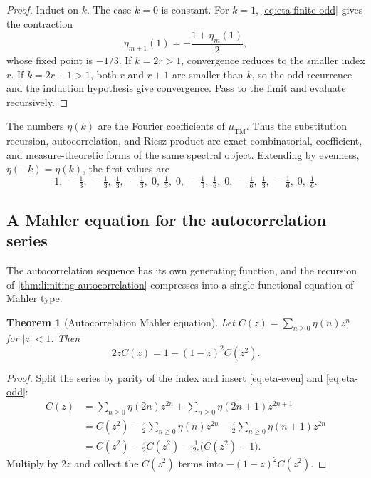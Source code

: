 \documentclass[11pt,oneside]{article}
\numberwithin{equation}{section}
\newtheorem{theorem}{Theorem}[section]
\theoremstyle{definition}
\theoremstyle{remark}
\begin{document}
\begin{proof}
Induct on \(k\).  The case \(k=0\) is constant.  For \(k=1\),
\eqref{eq:eta-finite-odd} gives the contraction
\[
 \eta_{m+1}(1)=-\frac{1+\eta_m(1)}2,
\]
whose fixed point is \(-1/3\).  If \(k=2r>1\), convergence reduces to the
smaller index \(r\).  If \(k=2r+1>1\), both \(r\) and \(r+1\) are smaller
than \(k\), so the odd recurrence and the induction hypothesis give
convergence.  Pass to the limit and evaluate recursively.
\end{proof}

The numbers \(\eta(k)\) are the Fourier coefficients of
\(\mu_{\mathrm{TM}}\).  Thus the substitution recursion, autocorrelation, and
Riesz product are exact combinatorial, coefficient, and measure-theoretic
forms of the same spectral object.  Extending by evenness,
\(\eta(-k)=\eta(k)\), the first values are
\begin{equation}
 1,\;-\tfrac13,\;-\tfrac13,\;\tfrac13,\;-\tfrac13,\;0,\;\tfrac13,\;0,\;
 -\tfrac13,\;\tfrac16,\;0,\;-\tfrac16,\;\tfrac13,\;-\tfrac16,\;0,\;\tfrac16.
 \label{eq:eta-first-values}
\end{equation}

\subsection{A Mahler equation for the autocorrelation series}

The autocorrelation sequence has its own generating function, and the
recursion of \cref{thm:limiting-autocorrelation} compresses into a single
functional equation of Mahler type.

\begin{theorem}[Autocorrelation Mahler equation]
\label{thm:autocorrelation-mahler}
Let \(C(z)=\sum_{n\ge0}\eta(n)z^n\) for \(|z|<1\).  Then
\begin{equation}
  \boxed{
  2zC(z)=1-(1-z)^2C(z^2).}
  \label{eq:autocorrelation-mahler}
\end{equation}
\end{theorem}

\begin{proof}
Split the series by parity of the index and insert
\eqref{eq:eta-even} and \eqref{eq:eta-odd}:
\begin{align*}
 C(z)
 &=\sum_{n\ge0}\eta(2n)z^{2n}
  +\sum_{n\ge0}\eta(2n+1)z^{2n+1}\\
 &=C(z^2)
  -\frac z2\sum_{n\ge0}\eta(n)z^{2n}
  -\frac z2\sum_{n\ge0}\eta(n+1)z^{2n}\\
 &=C(z^2)-\frac z2C(z^2)
  -\frac1{2z}\bigl(C(z^2)-1\bigr).
\end{align*}
Multiply by \(2z\) and collect the \(C(z^2)\) terms into
\(-(1-z)^2C(z^2)\).
\end{proof}
\end{document}
